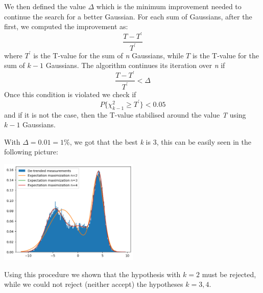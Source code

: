 \documentclass[10pt,a4paper]{article}
\begin{document}
We then defined the value \(\Delta\) which is the minimum improvement needed to continue the search for a better Gaussian. For each sum of Gaussians, after the first, we computed the improvement as: \[\frac{T - T^\prime}{T^\prime}\] where \(T^{\prime}\) is the T-value for the sum of \emph{n} Gaussians, while \(T\) is the T-value for the sum of \(k-1\) Gaussians. The algorithm continues its iteration over \emph{n} if \[\frac{T - T^\prime}{T^\prime} < \Delta\] Once this condition is violated we check if \[P\{\chi^{2}_{k-1} \geq T^\prime\} < 0.05\] and if it is not the case, then the T-value stabilised around the value \emph{T} using \(k-1\) Gaussians.

With \(\Delta = 0.01 = 1\%\), we got that the best \emph{k} is 3, this can be easily seen in the following picture:

\begin{center}
  \includegraphics[width=0.5\textwidth]{point5.png}
\end{center}

Using this procedure we shown that the hypothesis with \(k = 2\) must be rejected, while we could not reject (neither accept) the hypotheses \(k = 3, 4\).
\end{document}

